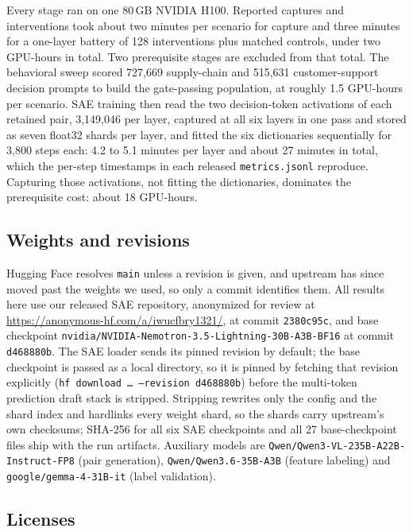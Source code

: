 \documentclass{article}
\begin{document}
Every stage ran on one 80\,GB NVIDIA H100. Reported captures and interventions
took about two minutes per scenario for capture and three minutes for a
one-layer battery of 128 interventions plus matched controls, under two
GPU-hours in total. Two prerequisite stages are excluded from that total. The
behavioral sweep scored 727,669 supply-chain and 515,631 customer-support
decision prompts to build the gate-passing population, at roughly 1.5
GPU-hours per scenario. SAE training then read the two
decision-token activations of each retained pair, 3,149,046 per layer,
captured at all six layers in one pass and stored as seven float32 shards per
layer, and fitted the six dictionaries sequentially for
3,800 steps each: 4.2 to 5.1 minutes per layer and about 27 minutes in total,
which the per-step timestamps in each released \texttt{metrics.jsonl}
reproduce. Capturing those activations, not fitting the dictionaries,
dominates the prerequisite cost: about 18 GPU-hours.

\subsection{Weights and revisions}

Hugging Face resolves \texttt{main} unless a revision is given, and upstream
has since moved past the weights we used, so only a commit identifies them.
All results here use our released SAE repository, anonymized for review at
\url{https://anonymous-hf.com/a/iwucfbry1321/}, at commit \texttt{2380c95c},
and base checkpoint
\texttt{nvidia/NVIDIA-Nemotron-3.5-Lightning-30B-A3B-BF16} at commit
\texttt{d468880b}. The SAE loader
sends its pinned revision by default; the base checkpoint is passed as a local
directory, so it is pinned by fetching that revision explicitly
(\texttt{hf download \ldots{} --revision d468880b}) before the multi-token
prediction draft stack is stripped. Stripping rewrites only the config and the
shard index and hardlinks every weight shard, so the shards carry upstream's
own checksums; SHA-256 for all six SAE checkpoints and all 27 base-checkpoint
files ship with the run artifacts. Auxiliary models are
\texttt{Qwen/Qwen3-VL-235B-A22B-Instruct-FP8} (pair generation),
\texttt{Qwen/Qwen3.6-35B-A3B} (feature labeling) and
\texttt{google/gemma-4-31B-it} (label validation).

\subsection{Licenses}
\end{document}

